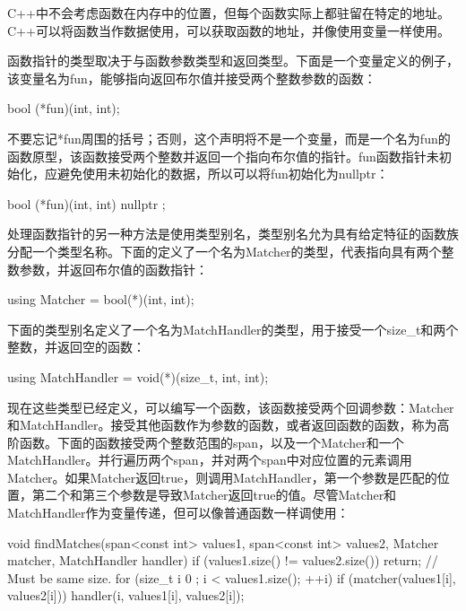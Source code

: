 
C++中不会考虑函数在内存中的位置，但每个函数实际上都驻留在特定的地址。C++可以将函数当作数据使用，可以获取函数的地址，并像使用变量一样使用。

函数指针的类型取决于与函数参数类型和返回类型。下面是一个变量定义的例子，该变量名为fun，能够指向返回布尔值并接受两个整数参数的函数：

\begin{cpp}
bool (*fun)(int, int);
\end{cpp}

不要忘记*fun周围的括号；否则，这个声明将不是一个变量，而是一个名为fun的函数原型，该函数接受两个整数并返回一个指向布尔值的指针。fun函数指针未初始化，应避免使用未初始化的数据，所以可以将fun初始化为nullptr：

\begin{cpp}
bool (*fun)(int, int) { nullptr };
\end{cpp}


处理函数指针的另一种方法是使用类型别名，类型别名允为具有给定特征的函数族分配一个类型名称。下面的定义了一个名为Matcher的类型，代表指向具有两个整数参数，并返回布尔值的函数指针：

\begin{cpp}
using Matcher = bool(*)(int, int);
\end{cpp}

下面的类型别名定义了一个名为MatchHandler的类型，用于接受一个size\_t和两个整数，并返回空的函数：

\begin{cpp}
using MatchHandler = void(*)(size_t, int, int);
\end{cpp}

现在这些类型已经定义，可以编写一个函数，该函数接受两个回调参数：Matcher和MatchHandler。接受其他函数作为参数的函数，或者返回函数的函数，称为高阶函数。下面的函数接受两个整数范围的span，以及一个Matcher和一个MatchHandler。并行遍历两个span，并对两个span中对应位置的元素调用Matcher。如果Matcher返回true，则调用MatchHandler，第一个参数是匹配的位置，第二个和第三个参数是导致Matcher返回true的值。尽管Matcher和MatchHandler作为变量传递，但可以像普通函数一样调使用：

\begin{cpp}
void findMatches(span<const int> values1, span<const int> values2,
Matcher matcher, MatchHandler handler)
{
    if (values1.size() != values2.size()) { return; } // Must be same size.
    for (size_t i { 0 }; i < values1.size(); ++i) {
        if (matcher(values1[i], values2[i])) {
            handler(i, values1[i], values2[i]);
        }
    }
}
\end{cpp}

